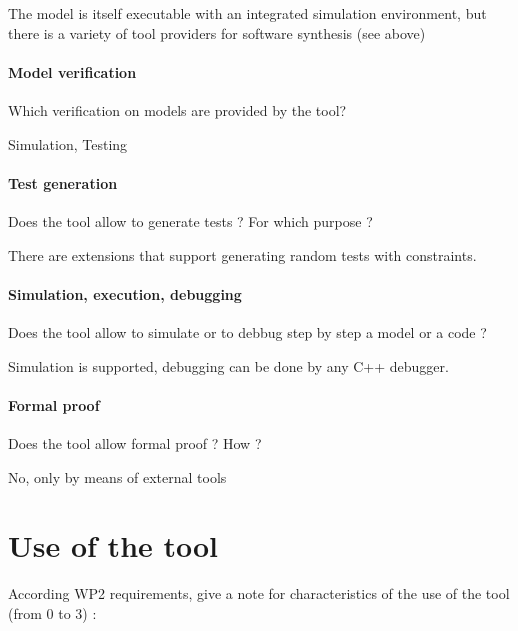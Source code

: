 The model is itself executable with an integrated simulation environment, but there is a variety of tool providers for software synthesis (see above)

\paragraph{Model verification}
Which verification on models are provided by the tool?

Simulation, Testing

\paragraph{Test generation}
Does the tool allow to generate tests ? For which purpose ?

There are extensions that support generating random tests with constraints.

\paragraph{Simulation, execution, debugging}
Does the tool allow to simulate or to debbug step by step a model or a code ?

Simulation is supported, debugging can be done by any C++ debugger.

\paragraph{Formal proof}
Does the tool allow formal proof ? How ?

No, only by means of external tools


\section{Use of the tool}


According WP2 requirements, give a note for characteristics of the use of the tool (from 0 to 3) :

